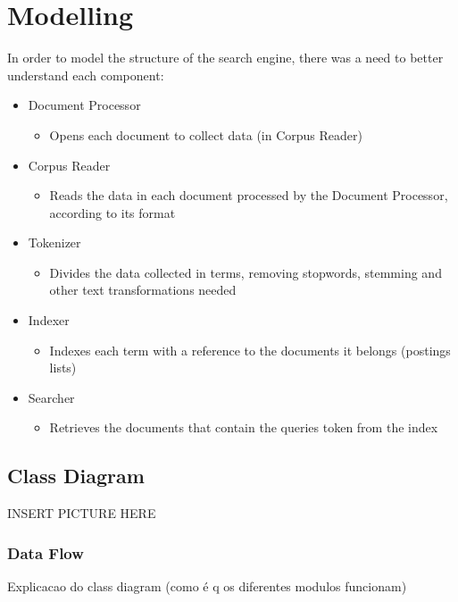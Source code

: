 \documentclass[11pt,a4paper]{report}
\begin{document}
\chapter{Modelling}
In order to model the structure of the search engine, there was a need to better understand each component:
\begin{itemize}
\item Document Processor
\begin{itemize}
\item[\textperiodcentered]Opens each document to collect data (in Corpus Reader)
\end{itemize}
\item Corpus Reader
\begin{itemize}
\item[\textperiodcentered]Reads the data in each document processed by the Document Processor, according to its format
\end{itemize}
\item Tokenizer
\begin{itemize}
\item[\textperiodcentered]Divides the data collected in terms, removing stopwords, stemming and other text transformations needed
\end{itemize}
\item Indexer
\begin{itemize}
\item[\textperiodcentered]Indexes each term with a reference to the documents it belongs (postings lists)
\end{itemize}
\item Searcher
\begin{itemize}
\item[\textperiodcentered]Retrieves the documents that contain the queries token from the index
\end{itemize}
\end{itemize}
\section{Class Diagram}
INSERT PICTURE HERE
\subsection{Data Flow}
Explicacao do class diagram (como é q os diferentes modulos funcionam)
\end{document}
